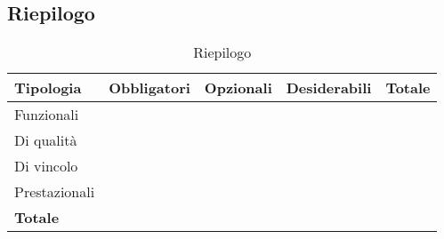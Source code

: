 \subsection{Riepilogo}
\begin{table}[!h]
    \begin{center}
        \begin{tabular}{ |l |l |l |l| l| }
            \hline 
            \textbf{Tipologia} & \textbf{Obbligatori} & \textbf{Opzionali} & \textbf{Desiderabili} & \textbf{Totale}\\\hline
            Funzionali         &                     &                      &                &                    \\
            Di qualità         &                     &                      &                &                    \\
            Di vincolo         &                     &                      &                &                    \\
            Prestazionali      &                     &                      &                &                    \\\hline
            \textbf{Totale}           &                     &                      &                &                    \\
            \hline
        \end{tabular}
    \end{center}
    \caption{Riepilogo}
    \label{tab:7}
\end{table}

